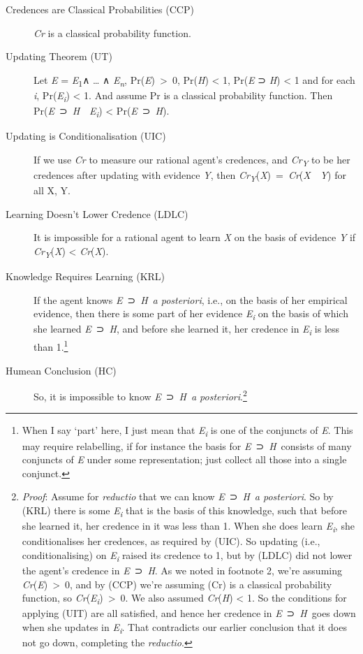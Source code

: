 \documentclass[
  11pt,
  letterpaper,
  DIV=11,
  numbers=noendperiod,
  twoside]{scrartcl}
\begin{document}
\begin{description}
\item[Credences are Classical Probabilities (CCP)]
\emph{Cr} is a classical probability function.
\item[Updating Theorem (UT)]
Let \emph{E} = \emph{E}\textsubscript{1}∧ \ldots{} ∧
\emph{E\textsubscript{n}}, Pr(\emph{E})~\textgreater~0, Pr(\emph{H})
\textless{} 1, Pr(\emph{E} ⊃ \emph{H}) \textless{} 1 and for each
\emph{i}, Pr(\emph{E\textsubscript{i}}) \textless{} 1. And assume Pr is
a classical probability function. Then
Pr(\emph{E}~⊃~\emph{H}~\textbar~\emph{E\textsubscript{i}}) \textless{}
Pr(\emph{E}~⊃~\emph{H}).
\item[Updating is Conditionalisation (UIC)]
If we use \emph{Cr} to measure our rational agent's credences, and
\emph{Cr\textsubscript{Y}} to be her credences after updating with
evidence \emph{Y}, then
\emph{Cr\textsubscript{Y}}(\emph{X})~=~\emph{Cr}(\emph{X}~\textbar~\emph{Y})
for all X, Y.
\item[Learning Doesn't Lower Credence (LDLC)]
It is impossible for a rational agent to learn \emph{X} on the basis of
evidence \emph{Y} if \emph{Cr\textsubscript{Y}}(\emph{X}) \textless{}
\emph{Cr}(\emph{X}).
\item[Knowledge Requires Learning (KRL)]
If the agent knows \emph{E}~⊃~\emph{H}~\emph{a posteriori}, i.e., on the
basis of her empirical evidence, then there is some part of her evidence
\emph{E\textsubscript{i}} on the basis of which she learned
\emph{E}~⊃~\emph{H}, and before she learned it, her credence in
\emph{E\textsubscript{i}} is less than 1.\footnote{When I say `part'
  here, I just mean that \emph{E\textsubscript{i}} is one of the
  conjuncts of \emph{E}. This may require relabelling, if for instance
  the basis for \emph{E}~⊃~\emph{H}~consists of many conjuncts of
  \emph{E} under some representation; just collect all those into a
  single conjunct.}
\item[Humean Conclusion (HC)]
So, it is impossible to know \emph{E}~⊃~\emph{H}~\emph{a
posteriori}.\footnote{\emph{Proof}: Assume for \emph{reductio} that we
  can know \emph{E}~⊃~\emph{H}~\emph{a posteriori}. So by (KRL) there is
  some \emph{E\textsubscript{i}} that is the basis of this knowledge,
  such that before she learned it, her credence in it was less than 1.
  When she does learn \emph{E\textsubscript{i}}, she conditionalises her
  credences, as required by (UIC). So updating (i.e., conditionalising)
  on \emph{E\textsubscript{i}} raised its credence to 1, but by (LDLC)
  did not lower the agent's credence in \emph{E}~⊃~\emph{H}. As we noted
  in footnote 2, we're assuming \emph{Cr}(\emph{E})~\textgreater~0, and
  by (CCP) we're assuming (Cr) is a classical probability function, so
  \emph{Cr}(\emph{E\textsubscript{i}})~\textgreater~0. We also assumed
  \emph{Cr}(\emph{H}) \textless{} 1. So the conditions for applying
  (UIT) are all satisfied, and hence her credence in
  \emph{E}~⊃~\emph{H}~goes down when she updates in
  \emph{E\textsubscript{i}}. That contradicts our earlier conclusion
  that it does not go down, completing the \emph{reductio}.}
\end{description}
\end{document}
